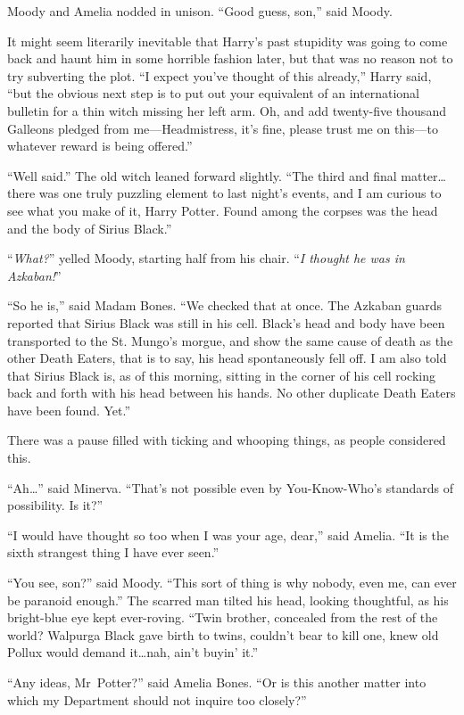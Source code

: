 Moody and Amelia nodded in unison. “Good guess, son,” said Moody.

It might seem literarily inevitable that Harry’s past stupidity was going to come back and haunt him in some horrible fashion later, but that was no reason not to try subverting the plot. “I expect you’ve thought of this already,” Harry said, “but the obvious next step is to put out your equivalent of an international bulletin for a thin witch missing her left arm. Oh, and add twenty-five thousand Galleons pledged from me—Headmistress, it’s fine, please trust me on this—to whatever reward is being offered.”

“Well said.” The old witch leaned forward slightly. “The third and final matter…there was one truly puzzling element to last night’s events, and I am curious to see what you make of it, Harry Potter. Found among the corpses was the head and the body of Sirius Black.”

“\emph{What?}” yelled Moody, starting half from his chair. “\emph{I thought he was in Azkaban!}”

“So he is,” said Madam Bones. “We checked that at once. The Azkaban guards reported that Sirius Black was still in his cell. Black’s head and body have been transported to the St. Mungo’s morgue, and show the same cause of death as the other Death Eaters, that is to say, his head spontaneously fell off. I am also told that Sirius Black is, as of this morning, sitting in the corner of his cell rocking back and forth with his head between his hands. No other duplicate Death Eaters have been found. Yet.”

There was a pause filled with ticking and whooping things, as people considered this.

“Ah…” said Minerva. “That’s not possible even by You-Know-Who’s standards of possibility. Is it?”

“I would have thought so too when I was your age, dear,” said Amelia. “It is the sixth strangest thing I have ever seen.”

“You see, son?” said Moody. “This sort of thing is why nobody, even me, can ever be paranoid enough.” The scarred man tilted his head, looking thoughtful, as his bright-blue eye kept ever-roving. “Twin brother, concealed from the rest of the world? Walpurga Black gave birth to twins, couldn’t bear to kill one, knew old Pollux would demand it…nah, ain’t buyin’ it.”

“Any ideas, Mr~Potter?” said Amelia Bones. “Or is this another matter into which my Department should not inquire too closely?”

